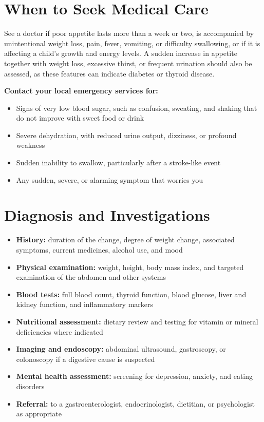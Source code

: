 \section*{When to Seek Medical Care}
See a doctor if poor appetite lasts more than a week or two, is accompanied by unintentional weight loss, pain, fever, vomiting, or difficulty swallowing, or if it is affecting a child's growth and energy levels. A sudden increase in appetite together with weight loss, excessive thirst, or frequent urination should also be assessed, as these features can indicate diabetes or thyroid disease.

\medskip
\textbf{Contact your local emergency services for:}
\begin{itemize}
    \item Signs of very low blood sugar, such as confusion, sweating, and shaking that do not improve with sweet food or drink
    \item Severe dehydration, with reduced urine output, dizziness, or profound weakness
    \item Sudden inability to swallow, particularly after a stroke-like event
    \item Any sudden, severe, or alarming symptom that worries you
\end{itemize}

\section*{Diagnosis and Investigations}
\begin{itemize}
    \item \textbf{History:} duration of the change, degree of weight change, associated symptoms, current medicines, alcohol use, and mood
    \item \textbf{Physical examination:} weight, height, body mass index, and targeted examination of the abdomen and other systems
    \item \textbf{Blood tests:} full blood count, thyroid function, blood glucose, liver and kidney function, and inflammatory markers
    \item \textbf{Nutritional assessment:} dietary review and testing for vitamin or mineral deficiencies where indicated
    \item \textbf{Imaging and endoscopy:} abdominal ultrasound, gastroscopy, or colonoscopy if a digestive cause is suspected
    \item \textbf{Mental health assessment:} screening for depression, anxiety, and eating disorders
    \item \textbf{Referral:} to a gastroenterologist, endocrinologist, dietitian, or psychologist as appropriate
\end{itemize}

